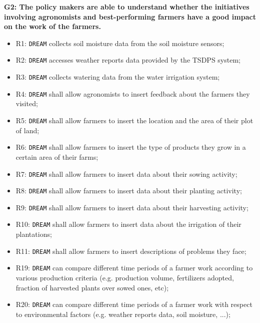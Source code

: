 \documentclass{article}
\begin{document}
\vspace{5mm}
\textbf{G2: The policy makers are able to understand whether the initiatives involving agronomists and best-performing farmers have a good impact on the work of the farmers.}
\begin{itemize}
    \item R1: \verb|DREAM| collects soil moisture data from the soil moisture sensors;
    \item R2: \verb|DREAM| accesses weather reports data provided by the TSDPS system;

    \item R3: \verb|DREAM| collects watering data from the water irrigation system;

    \item R4: \verb|DREAM| shall allow agronomists to insert feedback about the farmers they visited;

    \item R5: \verb|DREAM| shall allow farmers to insert the location and the area of their plot of land;

    \item R6: \verb|DREAM| shall allow farmers to insert the type of products they grow in a certain area of their farms;

    \item R7: \verb|DREAM| shall allow farmers to insert data about their sowing activity;

    \item R8: \verb|DREAM| shall allow farmers to insert data about their planting activity;
    
    \item R9: \verb|DREAM| shall allow farmers to insert data about their harvesting activity;
    
    \item R10: \verb|DREAM| shall allow farmers to insert data about the irrigation of their plantations;
    
    \item R11: \verb|DREAM| shall allow farmers to insert descriptions of problems they face;

    \item R19: \verb|DREAM| can compare different time periods of a farmer work according to various production criteria (e.g. production volume, fertilizers adopted, fraction of harvested plants over sowed ones, etc);
  
    \item R20: \verb|DREAM| can compare different time periods of a  farmer work with respect to environmental factors (e.g. weather reports data, soil moisture, ...);


\end{itemize}
\end{document}
